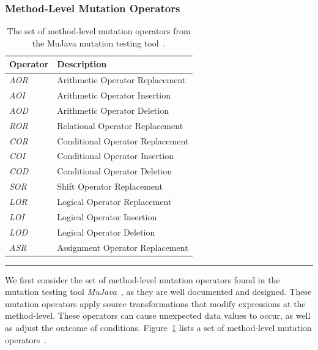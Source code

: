 \subsubsection{Method-Level Mutation Operators}
\label{subsubsec:background_method_operators}
\begin{table}[!tb]
  \centering
  \begin{tabular}{|l|l|}
    \hline
    \rowcolor[RGB]{169,196,223}
    \textbf{Operator} & \textbf{Description} \\
    \hline \emph{AOR} & Arithmetic Operator Replacement \\
    \hline \emph{AOI} & Arithmetic Operator Insertion \\
    \hline \emph{AOD} & Arithmetic Operator Deletion \\
    \hline \emph{ROR} & Relational Operator Replacement \\
    \hline \emph{COR} & Conditional Operator Replacement \\
    \hline \emph{COI} & Conditional Operator Insertion \\
    \hline \emph{COD} & Conditional Operator Deletion \\
    \hline \emph{SOR} & Shift Operator Replacement \\
    \hline \emph{LOR} & Logical Operator Replacement \\
    \hline \emph{LOI} & Logical Operator Insertion \\
    \hline \emph{LOD} & Logical Operator Deletion \\
    \hline \emph{ASR} & Assignment Operator Replacement \\
    \hline
  \end{tabular}
  \caption{The set of method-level mutation operators from the MuJava mutation testing tool~\cite{MOK05, MO05a}.}
  \label{tab:method_operators}
  \vspace{2mm}
  \hrule
\end{table}

We first consider the set of method-level mutation operators found in the mutation testing tool \emph{MuJava}~\cite{MOK05}, as they are well documented and designed. These mutation operators apply source transformations that modify expressions at the method-level. These operators can cause unexpected data values to occur, as well as adjust the outcome of conditions. Figure~\ref{tab:method_operators} lists a set of method-level mutation operators~\cite{MO05a}.

